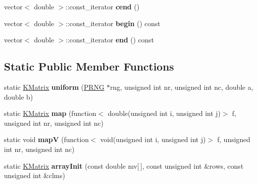 \begin{DoxyCompactItemize}
\item 
\hypertarget{class_k_base_1_1_k_matrix_a6ce3854ba4e8d8c4bd7f3c8ba776035f}{vector$<$ double $>$\-::const\-\_\-iterator {\bfseries cend} ()}\label{class_k_base_1_1_k_matrix_a6ce3854ba4e8d8c4bd7f3c8ba776035f}

\item 
\hypertarget{class_k_base_1_1_k_matrix_acdc3441642f9b30b6f60245ebcba19d7}{vector$<$ double $>$\-::const\-\_\-iterator {\bfseries begin} () const }\label{class_k_base_1_1_k_matrix_acdc3441642f9b30b6f60245ebcba19d7}

\item 
\hypertarget{class_k_base_1_1_k_matrix_aa78634fb071c07e3666953ae3d46b5d0}{vector$<$ double $>$\-::const\-\_\-iterator {\bfseries end} () const }\label{class_k_base_1_1_k_matrix_aa78634fb071c07e3666953ae3d46b5d0}

\end{DoxyCompactItemize}
\subsection*{Static Public Member Functions}
\begin{DoxyCompactItemize}
\item 
\hypertarget{class_k_base_1_1_k_matrix_a1dccc21222d9e23d23d8b817f34be1b6}{static \hyperlink{class_k_base_1_1_k_matrix}{K\-Matrix} {\bfseries uniform} (\hyperlink{class_k_base_1_1_p_r_n_g}{P\-R\-N\-G} $\ast$rng, unsigned int nr, unsigned int nc, double a, double b)}\label{class_k_base_1_1_k_matrix_a1dccc21222d9e23d23d8b817f34be1b6}

\item 
\hypertarget{class_k_base_1_1_k_matrix_a71870c0b41f64264b8237b7babe3ef32}{static \hyperlink{class_k_base_1_1_k_matrix}{K\-Matrix} {\bfseries map} (function$<$ double(unsigned int i, unsigned int j)$>$ f, unsigned int nr, unsigned int nc)}\label{class_k_base_1_1_k_matrix_a71870c0b41f64264b8237b7babe3ef32}

\item 
\hypertarget{class_k_base_1_1_k_matrix_a4178571f049c87caa81152ea8ef57f39}{static void {\bfseries map\-V} (function$<$ void(unsigned int i, unsigned int j)$>$ f, unsigned int nr, unsigned int nc)}\label{class_k_base_1_1_k_matrix_a4178571f049c87caa81152ea8ef57f39}

\item 
\hypertarget{class_k_base_1_1_k_matrix_a4b3e5d66773ea8b8e7a39a67a8f28ece}{static \hyperlink{class_k_base_1_1_k_matrix}{K\-Matrix} {\bfseries array\-Init} (const double mv\mbox{[}$\,$\mbox{]}, const unsigned int \&rows, const unsigned int \&clms)}\label{class_k_base_1_1_k_matrix_a4b3e5d66773ea8b8e7a39a67a8f28ece}

\end{DoxyCompactItemize}
